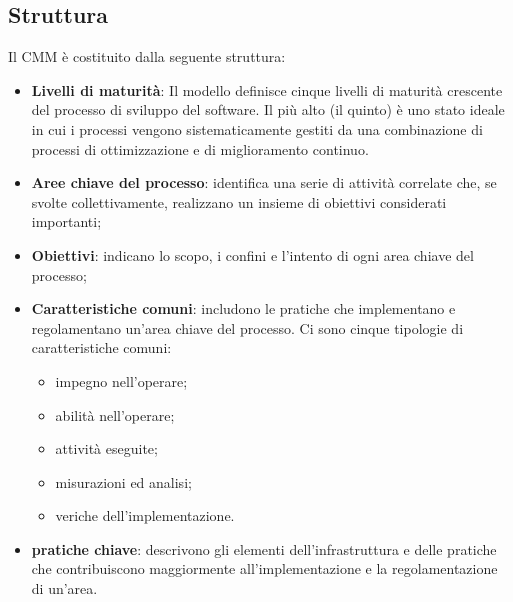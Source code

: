 \documentclass[PdQ.tex]{subfiles}
\begin{document}
	\subsection{Struttura}
	Il CMM è costituito dalla seguente struttura:
	\begin{itemize}
		\item \textbf{Livelli di maturità}: Il modello definisce cinque livelli di maturità crescente del processo di sviluppo del software. Il più alto (il quinto) è uno stato ideale in cui i processi vengono sistematicamente
		gestiti da una combinazione di processi di ottimizzazione e di miglioramento continuo. 
		\item \textbf{Aree chiave del processo}: identifica una serie di attività correlate che, se svolte collettivamente,
		realizzano un insieme di obiettivi considerati importanti;
		\item \textbf{Obiettivi}: indicano lo scopo, i confini e l'intento di ogni area chiave del processo;
		\item \textbf{Caratteristiche comuni}: includono le pratiche che implementano e regolamentano un'area chiave del processo. Ci sono cinque
		tipologie di caratteristiche comuni:
		\begin{itemize}
			\item impegno nell'operare;
			\item abilità nell'operare;
			\item attività eseguite;
			\item misurazioni ed analisi;
			\item veriche dell'implementazione.
		\end{itemize}
		\item \textbf{pratiche chiave}: descrivono gli elementi dell'infrastruttura e delle pratiche che contribuiscono maggiormente all'implementazione
		e la regolamentazione di un'area.
	\end{itemize}
	
\end{document}
